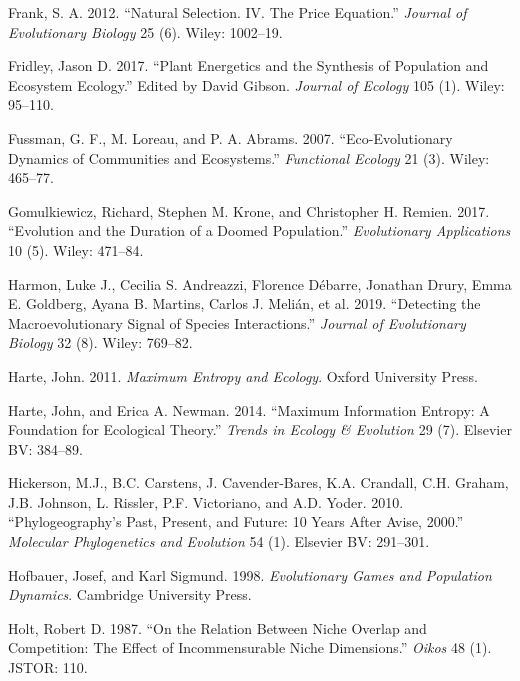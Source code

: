 \documentclass[]{article}
\begin{document}
\leavevmode\hypertarget{ref-FRANK2012}{}%
Frank, S. A. 2012. ``Natural Selection. IV. The Price Equation.''
\emph{Journal of Evolutionary Biology} 25 (6). Wiley: 1002--19.

\leavevmode\hypertarget{ref-Fridley2017}{}%
Fridley, Jason D. 2017. ``Plant Energetics and the Synthesis of
Population and Ecosystem Ecology.'' Edited by David Gibson.
\emph{Journal of Ecology} 105 (1). Wiley: 95--110.

\leavevmode\hypertarget{ref-FUSSMANN2007}{}%
Fussman, G. F., M. Loreau, and P. A. Abrams. 2007. ``Eco-Evolutionary
Dynamics of Communities and Ecosystems.'' \emph{Functional Ecology} 21
(3). Wiley: 465--77.

\leavevmode\hypertarget{ref-Gomulkiewicz2017}{}%
Gomulkiewicz, Richard, Stephen M. Krone, and Christopher H. Remien.
2017. ``Evolution and the Duration of a Doomed Population.''
\emph{Evolutionary Applications} 10 (5). Wiley: 471--84.

\leavevmode\hypertarget{ref-Harmon2019}{}%
Harmon, Luke J., Cecilia S. Andreazzi, Florence Débarre, Jonathan Drury,
Emma E. Goldberg, Ayana B. Martins, Carlos J. Melián, et al. 2019.
``Detecting the Macroevolutionary Signal of Species Interactions.''
\emph{Journal of Evolutionary Biology} 32 (8). Wiley: 769--82.

\leavevmode\hypertarget{ref-Harte2011}{}%
Harte, John. 2011. \emph{Maximum Entropy and Ecology}. Oxford University
Press.

\leavevmode\hypertarget{ref-Harte2014}{}%
Harte, John, and Erica A. Newman. 2014. ``Maximum Information Entropy: A
Foundation for Ecological Theory.'' \emph{Trends in Ecology \&
Evolution} 29 (7). Elsevier BV: 384--89.

\leavevmode\hypertarget{ref-Hickerson2010}{}%
Hickerson, M.J., B.C. Carstens, J. Cavender-Bares, K.A. Crandall, C.H.
Graham, J.B. Johnson, L. Rissler, P.F. Victoriano, and A.D. Yoder. 2010.
``Phylogeography's Past, Present, and Future: 10 Years After Avise,
2000.'' \emph{Molecular Phylogenetics and Evolution} 54 (1). Elsevier
BV: 291--301.

\leavevmode\hypertarget{ref-Hofbauer1998}{}%
Hofbauer, Josef, and Karl Sigmund. 1998. \emph{Evolutionary Games and
Population Dynamics}. Cambridge University Press.

\leavevmode\hypertarget{ref-Holt1987}{}%
Holt, Robert D. 1987. ``On the Relation Between Niche Overlap and
Competition: The Effect of Incommensurable Niche Dimensions.''
\emph{Oikos} 48 (1). JSTOR: 110.
\end{document}
